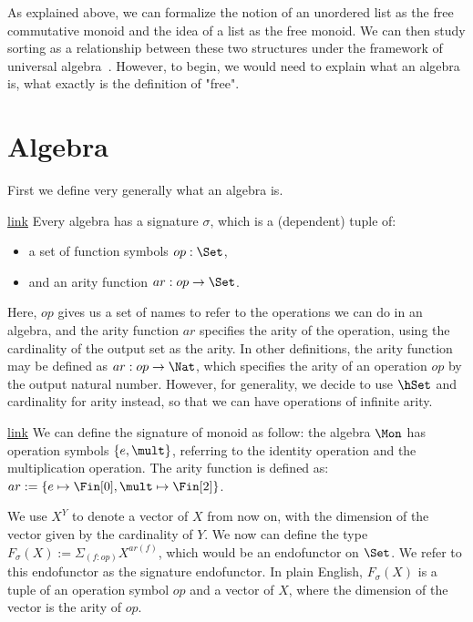 \label{sec:universal-algebra}

As explained above, we can formalize the notion of an unordered list
as the free commutative monoid and the idea of a list as the free
monoid. We can then study sorting as a relationship between these
two structures under the framework of universal algebra~\cite{birkhoffStructureAbstractAlgebras1935}.
However, to begin, we would need to explain what an algebra is,
what exactly is the definition of "free".

\section{Algebra}\label{algebra:signature}
First we define very generally what an algebra is.
\begin{definition}{\href{https://windtfw.com/agda-symmetries/Cubical.Structures.Sig.html#572}{link}}
Every algebra has a signature $\sigma$, which is a (dependent) tuple of:
\begin{itemize}
    \item a set of function symbols $op : \Set$,
    \item and an arity function $ar : op \to \Set$.
\end{itemize}
\end{definition}

Here, $op$ gives us a set of names to refer to the operations we can do
in an algebra, and the arity function $ar$ specifies the arity of the operation,
using the cardinality of the output set as the arity. In other definitions,
the arity function may be defined as $ar : op \to \Nat$, which specifies
the arity of an operation $op$ by the output natural number. However,
for generality, we decide to use $\hSet$ and cardinality for arity instead,
so that we can have operations of infinite arity. 

\begin{example}{\href{https://windtfw.com/agda-symmetries/Cubical.Structures.Set.Desc.Mon.html#600}{link}}
We can define the signature of monoid as follow: the algebra $\Mon$
has operation symbols $\{ e, \mult \}$, referring to the identity operation
and the multiplication operation. The arity function is defined as:
$ar := \{ e \mapsto \Fin[0], \mult \mapsto \Fin[2] \}$.
\end{example}

We use $X^Y$ to denote a vector of $X$ from now on, with the dimension of
the vector given by the cardinality of $Y$. We now can define the type
$F_\sigma(X) := \Sigma_{(f: op)}X^{ar(f)}$, which would be an endofunctor
on $\Set$. We refer to this endofunctor as the signature endofunctor.
In plain English, $F_\sigma(X)$ is a tuple of an operation symbol $op$
and a vector of $X$, where the dimension of the vector is the arity of $op$.

